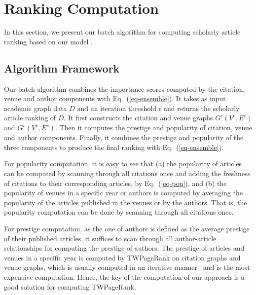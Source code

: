 \section{Ranking Computation}
\label{sec-alg}

In this section, we present our batch algorithm for computing scholarly article ranking based on our  model \ensemblerank.


\subsection{Algorithm Framework}
\label{subsec-bat-alg}

Our batch algorithm \batensemble  combines the importance scores computed by the citation, venue and author components with Eq.~(\ref{eq-ensemble}). It takes as input academic graph data $D$ and an iteration threshold $\epsilon$ and returns the scholarly article ranking of $D$. It first constructs the citation and venue graphs $G^c(V^c,E^c)$ and $G^v(V^v,E^v)$. Then it computes the prestige and popularity of citation, venue and author components.
Finally, it combines the  prestige and popularity of the three components to produce the final ranking with Eq.~(\ref{eq-ensemble}).



For popularity computation, it is easy to see that
(a) the popularity of articles can be computed by scanning through all citations once and adding the freshness of citations to their corresponding articles, by Eq.~(\ref{eq-pop}), and (b) the popularity of venues in a specific year or authors is computed by averaging the popularity of the articles published in the venues or by the authors.
That is, the popularity computation can be done by scanning through all citations once.


For prestige computation, as the one of authors is defined as the average prestige of their published articles,
it suffices to scan through all author-article  relationships for computing the prestige of authors. The prestige of  articles and venues in a specific year is computed by TWPageRank on citation graphs and venue graphs, which is usually computed in an iterative manner~\cite{Brin98:PageRank} and is the most expensive computation. Hence, the key of the computation of our approach is a good solution for computing TWPageRank.


